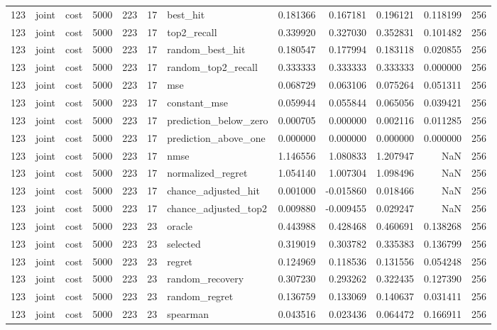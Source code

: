 \begin{tabular}{rllrrrlrrrrr}
123 & joint & cost & 5000 & 223 & 17 & best_hit & 0.181366 & 0.167181 & 0.196121 & 0.118199 & 256 \\
123 & joint & cost & 5000 & 223 & 17 & top2_recall & 0.339920 & 0.327030 & 0.352831 & 0.101482 & 256 \\
123 & joint & cost & 5000 & 223 & 17 & random_best_hit & 0.180547 & 0.177994 & 0.183118 & 0.020855 & 256 \\
123 & joint & cost & 5000 & 223 & 17 & random_top2_recall & 0.333333 & 0.333333 & 0.333333 & 0.000000 & 256 \\
123 & joint & cost & 5000 & 223 & 17 & mse & 0.068729 & 0.063106 & 0.075264 & 0.051311 & 256 \\
123 & joint & cost & 5000 & 223 & 17 & constant_mse & 0.059944 & 0.055844 & 0.065056 & 0.039421 & 256 \\
123 & joint & cost & 5000 & 223 & 17 & prediction_below_zero & 0.000705 & 0.000000 & 0.002116 & 0.011285 & 256 \\
123 & joint & cost & 5000 & 223 & 17 & prediction_above_one & 0.000000 & 0.000000 & 0.000000 & 0.000000 & 256 \\
123 & joint & cost & 5000 & 223 & 17 & nmse & 1.146556 & 1.080833 & 1.207947 & NaN & 256 \\
123 & joint & cost & 5000 & 223 & 17 & normalized_regret & 1.054140 & 1.007304 & 1.098496 & NaN & 256 \\
123 & joint & cost & 5000 & 223 & 17 & chance_adjusted_hit & 0.001000 & -0.015860 & 0.018466 & NaN & 256 \\
123 & joint & cost & 5000 & 223 & 17 & chance_adjusted_top2 & 0.009880 & -0.009455 & 0.029247 & NaN & 256 \\
123 & joint & cost & 5000 & 223 & 23 & oracle & 0.443988 & 0.428468 & 0.460691 & 0.138268 & 256 \\
123 & joint & cost & 5000 & 223 & 23 & selected & 0.319019 & 0.303782 & 0.335383 & 0.136799 & 256 \\
123 & joint & cost & 5000 & 223 & 23 & regret & 0.124969 & 0.118536 & 0.131556 & 0.054248 & 256 \\
123 & joint & cost & 5000 & 223 & 23 & random_recovery & 0.307230 & 0.293262 & 0.322435 & 0.127390 & 256 \\
123 & joint & cost & 5000 & 223 & 23 & random_regret & 0.136759 & 0.133069 & 0.140637 & 0.031411 & 256 \\
123 & joint & cost & 5000 & 223 & 23 & spearman & 0.043516 & 0.023436 & 0.064472 & 0.166911 & 256 \\

\end{tabular}
